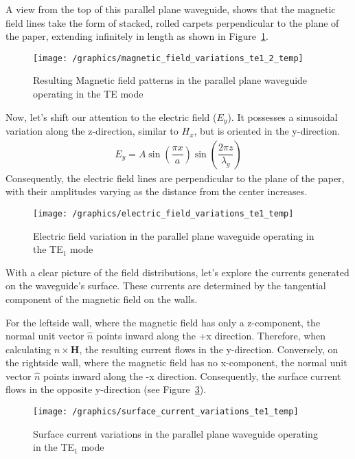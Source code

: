 A view from the top of this parallel plane waveguide, shows that the magnetic field lines take the form of stacked, rolled carpets perpendicular to the plane of the paper, extending infinitely in length as shown in Figure~\ref{fig:magnetic_field_variation}.
\begin{figure}[h]
\centering
\texttt{[image: /graphics/magnetic\_field\_variations\_te1\_2\_temp]}
\caption{Resulting Magnetic field patterns in the parallel plane waveguide operating in the TE mode}
\label{fig:magnetic_field_variation}
\end{figure}

Now, let's shift our attention to the electric field ($E_y$). It possesses a sinusoidal variation along the z-direction, similar to $H_x$, but is oriented in the y-direction.
\begin{align*}
E_y= A\sin(\dfrac{\pi x}{a})\sin(\dfrac{2\pi z}{\lambda_g})
\end{align*}
Consequently, the electric field lines are perpendicular to the plane of the paper, with their amplitudes varying as the distance from the center increases.
\begin{figure}[h]
\centering
\texttt{[image: /graphics/electric\_field\_variations\_te1\_temp]}
\caption{Electric field variation in the parallel plane waveguide operating in the TE$_1$ mode}
\label{fig:electric_field_variation}
\end{figure}

With a clear picture of the field distributions, let's explore the currents generated on the waveguide's surface. These currents are determined by the tangential component of the magnetic field on the walls.

For the leftside wall, where the magnetic field has only a z-component, the normal unit vector $\hat{n}$ points inward along the +x direction. Therefore, when calculating $\hat{n} \times \boldsymbol{H}$, the resulting current flows in the y-direction. Conversely, on the rightside wall, where the magnetic field has no x-component, the normal unit vector $\hat{n}$ points inward along the -x direction. Consequently, the surface current flows in the opposite y-direction (see Figure~\ref{fig:surface_current_variation}).
\begin{figure}[h]
\centering
\texttt{[image: /graphics/surface\_current\_variations\_te1\_temp]}
\caption{Surface current variations in the parallel plane waveguide operating in the TE$_1$ mode}
\label{fig:surface_current_variation}
\end{figure}

